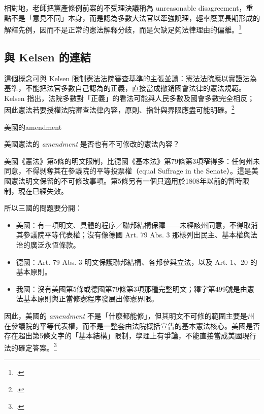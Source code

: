 相對地，老師把黨產條例前案的不受理決議稱為 unreasonable disagreement，重點不是「意見不同」本身，而是認為多數大法官以牽強說理，輕率廢棄長期形成的解釋先例，因而不是正常的憲法解釋分歧，而是欠缺足夠法律理由的偏離。\footcite[38, 40]{fallon2018}

\subsection{與 Kelsen 的連結}

這個概念可與 Kelsen 限制憲法法院審查基準的主張並讀：憲法法院應以實證法為基準，不能把法官多數自己認為的正義，直接當成撤銷國會法律的憲法規範。Kelsen 指出，法院多數對「正義」的看法可能與人民多數及國會多數完全相反；因此憲法若要授權法院審查法律內容，原則、指針與界限應盡可能明確。\footcites[59--61]{kelsen2015}[68--70]{kelsen1929}


\begin{qaprompt}
美國的amendment
\end{qaprompt}

\begin{qaquestion}
美國憲法的 \emph{amendment} 是否也有不可修改的憲法內容？
\end{qaquestion}

美國《憲法》第5條的明文限制，比德國《基本法》第79條第3項窄得多：任何州未同意，不得剝奪其在參議院的平等投票權（equal Suffrage in the Senate）。這是美國憲法明文保留的不可修改事項。第5條另有一個只適用於1808年以前的暫時限制，現在已經失效。

所以三國的問題要分開：

\begin{itemize}
\tightlist
\item
  美國：有一項明文、具體的程序／聯邦結構保障------未經該州同意，不得取消其參議院平等代表權；沒有像德國 Art. 79 Abs. 3 那樣列出民主、基本權與法治的廣泛永恆條款。
\item
  德國：Art. 79 Abs. 3 明文保護聯邦結構、各邦參與立法，以及 Art. 1、20 的基本原則。
\item
  我國：沒有美國第5條或德國第79條第3項那種完整明文；釋字第499號是由憲法基本原則與正當修憲程序發展出修憲界限。
\end{itemize}

因此，美國的 \emph{amendment} 不是「什麼都能修」，但其明文不可修的範圍主要是州在參議院的平等代表權，而不是一整套由法院概括宣告的基本憲法核心。美國是否存在超出第5條文字的「基本結構」限制，學理上有爭論，不能直接當成美國現行法的確定答案。\footcites{conan-artV1}{conan-artV5}

